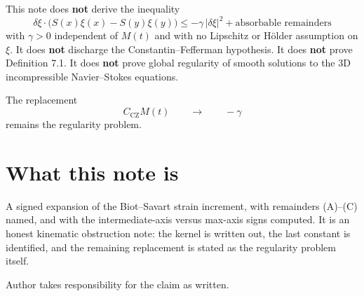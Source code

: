 \documentclass[11pt]{article}
\begin{document}
This note does \textbf{not} derive the inequality
\[
\delta\xi\cdot\bigl(S(x)\xi(x)-S(y)\xi(y)\bigr)\le-\gamma\,|\delta\xi|^2+\text{absorbable remainders}
\]
with \( \gamma>0 \) independent of \( M(t) \) and with no Lipschitz or H\"older assumption on \( \xi \). It does \textbf{not} discharge the Constantin--Fefferman hypothesis. It does \textbf{not} prove Definition 7.1. It does \textbf{not} prove global regularity of smooth solutions to the 3D incompressible Navier--Stokes equations.

The replacement
\[
C_{\mathrm{CZ}}M(t)\qquad\longrightarrow\qquad -\gamma
\]
remains the regularity problem.

\section{What this note is}
A signed expansion of the Biot--Savart strain increment, with remainders (A)--(C) named, and with the intermediate-axis versus max-axis signs computed. It is an honest kinematic obstruction note: the kernel is written out, the last constant is identified, and the remaining replacement is stated as the regularity problem itself.

Author takes responsibility for the claim as written.
\end{document}

